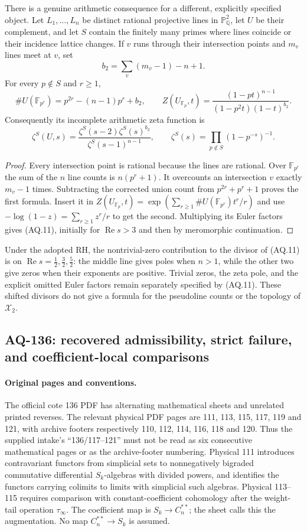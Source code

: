 \documentclass[11pt,a4paper]{article}
\theoremstyle{definition}\newtheorem{definition}[theorem]{Definition}
\theoremstyle{remark}\newtheorem{remark}[theorem]{Remark}
\begin{document}
There is a genuine arithmetic consequence for a
different, explicitly specified object.
Let $L_1,\dots,L_n$ be distinct rational projective
lines in $\mathbb P^2_{\mathbb Q}$, let $U$ be their
complement, and let $S$ contain the finitely many
primes where lines coincide or their incidence
lattice changes. If $v$ runs through their
intersection points and $m_v$ lines meet at $v$, set
\[
 b_2=\sum_v(m_v-1)-n+1.
\]
For every $p\notin S$ and $r\geq1$,
\[
 \#U(\mathbb F_{p^r})=p^{2r}-(n-1)p^r+b_2,\qquad
 Z(U_{\mathbb F_p},t)
  =\frac{(1-pt)^{n-1}}{(1-p^2t)(1-t)^{b_2}}.                  \tag{AQ.10}
\]
Consequently its incomplete arithmetic zeta function is
\[
 \zeta^S(U,s)=
 \frac{\zeta^S(s-2)\zeta^S(s)^{b_2}}
      {\zeta^S(s-1)^{n-1}},\qquad
 \zeta^S(s)=\prod_{p\notin S}(1-p^{-s})^{-1}.                 \tag{AQ.11}
\]
\begin{proof}
Every intersection point is rational because the
lines are rational. Over $\mathbb F_{p^r}$ the sum
of the $n$ line counts is $n(p^r+1)$.
It overcounts an intersection $v$ exactly $m_v-1$
times. Subtracting the corrected union count from
$p^{2r}+p^r+1$ proves the first formula.
Insert it in
$Z(U_{\mathbb F_p},t)=
\exp(\sum_{r\geq1}\#U(\mathbb F_{p^r})t^r/r)$
and use $-\log(1-z)=\sum_{r\geq1}z^r/r$ to get
the second. Multiplying its Euler factors gives
(AQ.11), initially for $\operatorname{Re}s>3$
and then by meromorphic continuation.
\end{proof}
Under the adopted RH, the nontrivial-zero contribution
to the divisor of (AQ.11) is on
$\operatorname{Re}s=\tfrac12,\tfrac32,\tfrac52$:
the middle line gives poles when $n>1$, while the
other two give zeros when their exponents are
positive. Trivial zeros, the zeta pole, and the
explicit omitted Euler factors remain separately
specified by (AQ.11). These shifted divisors do not
give a formula for the pseudoline counts or the
topology of $\mathcal X_2$.

\subsection{AQ-136: recovered admissibility, strict failure, and coefficient-local comparisons}

\paragraph{Original pages and conventions.}
The official cote 136 PDF has alternating mathematical sheets and
unrelated printed reverses.  The relevant physical PDF pages are
111, 113, 115, 117, 119 and 121, with archive footers respectively
110, 112, 114, 116, 118 and 120.  Thus the supplied intake's
``136/117--121'' must not be read as six consecutive mathematical
pages or as the archive-footer numbering.
Physical 111 introduces contravariant functors from simplicial
sets to nonnegatively bigraded commutative differential
$S_k$-algebras with divided powers, and identifies the functors
carrying colimits to limits with simplicial such algebras.
Physical 113--115 requires comparison with constant-coefficient
cohomology after the weight-tail operation $\tau_\infty$.
The coefficient map is $S_k\longrightarrow C_n^{**}$; the sheet
calls this the augmentation.  No map $C_n^{**}\to S_k$ is assumed.
\end{document}
